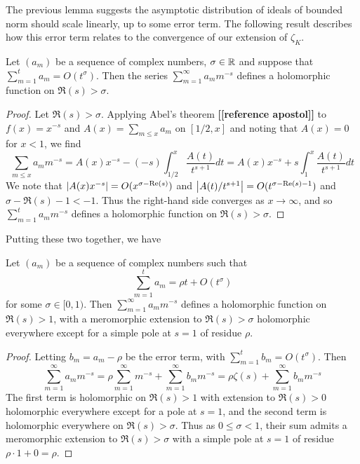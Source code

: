 \documentclass[11pt]{report}
\begin{document}
The previous lemma suggests the asymptotic distribution of ideals of bounded norm should scale linearly, up to some error term. The following result describes how this error term relates to the convergence of our extension of $\zeta_K$.

\begin{lemma}
    Let $(a_m)$ be a sequence of complex numbers, $\sigma \in \mathbb{R}$ and suppose that $\sum_{m = 1}^t a_m = O(t^\sigma)$. Then the series $\sum_{m = 1}^\infty a_mm^{-s}$ defines a holomorphic function on $\Re(s) > \sigma$.
\end{lemma}
\begin{proof}
    Let $\Re(s) > \sigma$. Applying Abel's theorem \textbf{[[reference apostol]]} to $f(x) = x^{-s}$ and $A(x) = \sum_{m \leq x}a_m$ on $[1/2, x]$ and noting that $A(x) = 0$ for $x < 1$, we find
    $$
        \sum_{m \leq x}a_mm^{-s} = A(x)x^{-s} - (-s)\int_{1/2}^x \frac{A(t)}{t^{s + 1}}dt = A(x)x^{-s} + s\int_1^x\frac{A(t)}{t^{s + 1}}dt
    $$
    We note that $\left| A(x)x^{-s} \right| = O(x^{\sigma - \text{Re}(s)})$ and $\left| A(t)/t^{s + 1} \right| = O(t^{\sigma - \text{Re}(s) - 1})$ and $\sigma - \Re(s) - 1 < -1$. Thus the right-hand side converges as $x \to \infty$, and so $\sum_{m = 1}^t a_mm^{-s}$ defines a holomorphic function on $\Re(s) > \sigma$.
\end{proof}
Putting these two together, we have
\begin{lemma}\label{growthrate}
    Let $(a_m)$ be a sequence of complex numbers such that
    $$
        \sum_{m = 1}^t a_m = \rho t + O(t^\sigma)
    $$
    for some $\sigma \in [0, 1)$. Then $\sum_{m = 1}^\infty a_mm^{-s}$ defines a holomorphic function on $\Re(s) > 1$, with a meromorphic extension to $\Re(s) > \sigma$ holomorphic everywhere except for a simple pole at $s = 1$ of residue $\rho$.
\end{lemma}
\begin{proof}
    Letting $b_m = a_m - \rho$ be the error term, with $\sum_{m = 1}^t b_m = O(t^\sigma)$. Then
    $$
        \sum_{m = 1}^\infty a_mm^{-s} = \rho\sum_{m = 1}^\infty m^{-s} + \sum_{m = 1}^\infty b_mm^{-s} = \rho\zeta(s) + \sum_{m = 1}^\infty b_mm^{-s}
    $$
    The first term is holomorphic on $\Re(s) > 1$ with extension to $\Re(s) > 0$ holomorphic everywhere except for a pole at $s = 1$, and the second term is holomorphic everywhere on $\Re(s) > \sigma$. Thus as $0 \leq \sigma < 1$, their sum admits a meromorphic extension to $\Re(s) > \sigma$ with a simple pole at $s = 1$ of residue $\rho \cdot 1 + 0 = \rho$.
\end{proof}
\end{document}
